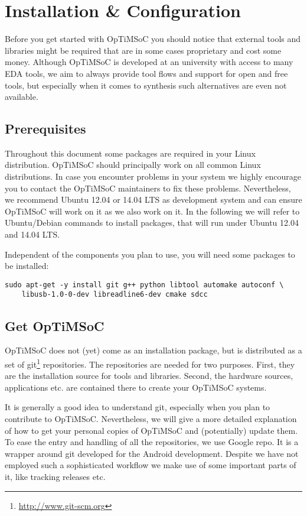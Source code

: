 \chapter{Installation \& Configuration}
\label{chap:installation}

Before you get started with OpTiMSoC you should notice that external
tools and libraries might be required that are in some cases
proprietary and cost some money. Although OpTiMSoC is developed at an
university with access to many EDA tools, we aim to always provide
tool flows and support for open and free tools, but especially when it
comes to synthesis such alternatives are even not available.

\section{Prerequisites}

Throughout this document some packages are required in your Linux
distribution. OpTiMSoC should principally work on all common Linux
distributions. In case you encounter problems in your system we highly
encourage you to contact the OpTiMSoC maintainers to fix these
problems. Nevertheless, we recommend Ubuntu 12.04 or 14.04 LTS as
development system and can ensure OpTiMSoC will work on it as we also
work on it. In the following we will refer to Ubuntu/Debian commands
to install packages, that will run under Ubuntu 12.04 and 14.04 LTS.

Independent of the components you plan to use, you will need some
packages to be installed:

\begin{lstlisting}
sudo apt-get -y install git g++ python libtool automake autoconf \
    libusb-1.0-0-dev libreadline6-dev cmake sdcc
\end{lstlisting}

\section{Get OpTiMSoC}

OpTiMSoC does not (yet) come as an installation package, but is
distributed as a set of git\footnote{\url{http://www.git-scm.org}}
repositories. The repositories are needed for two purposes. First,
they are the installation source for tools and libraries. Second, the
hardware sources, applications etc. are contained there to create your
OpTiMSoC systems.

It is generally a good idea to understand git, especially when you
plan to contribute to OpTiMSoC. Nevertheless, we will give a more
detailed explanation of how to get your personal copies of OpTiMSoC
and (potentially) update them. To ease the entry and handling of all
the repositories, we use Google repo. It is a wrapper around git
developed for the Android development. Despite we have not employed
such a sophisticated workflow we make use of some important parts of
it, like tracking releases etc.

